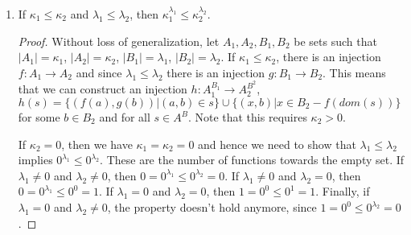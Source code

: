 \begin{enumerate}
    \item If $\kappa_1 \leq \kappa_2$ and $\lambda_1 \leq \lambda_2$, then $\kappa_1^{\lambda_1} \leq \kappa_2^{\lambda_2}$.
    
    \begin{proof}
    Without loss of generalization, let $A_1, A_2, B_1, B_2$ be sets such that $|A_1| = \kappa_1$, $|A_2| = \kappa_2$, $|B_1| = \lambda_1$, $|B_2| = \lambda_2$. If $\kappa_1 \leq \kappa_2$, there is an injection $f:A_1 \rightarrow A_2$ and since $\lambda_1 \leq \lambda_2$ there is an injection $g: B_1 \rightarrow B_2$. This means that we can construct an injection $h: A_1^{B_1} \rightarrow A_2^{B^2}$, $h(s) = \{(f(a), g(b))| (a,b) \in s\} \cup \{(x, b)| x \in B_2 - f(dom(s))\}$ for some $b \in B_2$ and for all $s \in A^B$.
    Note that this requires $\kappa_2 > 0$.
    
    If $\kappa_2 = 0$, then  we have $\kappa_1 = \kappa_2 = 0$ and hence we need to show that $\lambda_1 \leq \lambda_2$ implies $0^{\lambda_1} \leq 0^{\lambda_2}$. These are the number of functions towards the empty set. If $\lambda_1 \neq 0$ and $\lambda_2 \neq 0$, then $0 = 0^{\lambda_1} \leq 0^{\lambda_2} = 0$. If $\lambda_1 \neq 0$ and $\lambda_2 = 0$, then $0 = 0^{\lambda_1} \leq 0^0 = 1$. If $\lambda_1 = 0 $ and $\lambda_2 = 0$, then  $1 = 0^0 \leq 0^1 = 1$. Finally, if $\lambda_1 = 0$ and $\lambda_2 \neq 0$, the property doesn't hold anymore, since $1 = 0^0 \leq 0^{\lambda_2} = 0$. 
    \end{proof}
    
    \end{enumerate}
    
    

